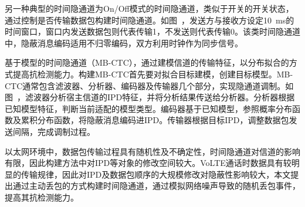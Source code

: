 另一种典型的时间隐通道为On/Off模式的时间隐通道，类似于开关的开关状态，通过控制是否传输数据包构建时间隐通道。如图\ ，发送方与接收方设定{10\ ms}的时间窗口，窗口内发送数据包则代表传输1，不发送则代表传输0。该类时间隐通道中，隐蔽消息编码适用不归零编码，双方利用时钟作为同步信号。

基于模型的时间隐通道（MB-CTC），通过建模信道的传输特征，以分布拟合的方式提高抗检测能力。构建MB-CTC首先要对拟合目标建模，创建目标模型。MB-CTC通常包含滤波器、分析器、编码器及传输器几个部分，实现隐通道调制。如图\ ，滤波器分析宿主信道的IPD特征，并将分析结果传送给分析器。分析器根据已知模型特征，判断当前适配的模型类型。编码器基于已知模型，参照概率分布函数及累积分布函数，将隐蔽消息编码进IPD。传输器根据目标IPD，调整数据包发送间隔，完成调制过程。

以太网环境中，数据包传输过程具有随机性及不确定性，时间隐通道对信道的影响有限，因此构建方法中对IPD等对象的修改空间较大。VoLTE通话时数据具有较明显的传输规律，因此对IPD及数据包顺序的大规模修改对隐蔽性影响较大，本文提出通过主动丢包的方式构建时间隐通道，通过模拟网络噪声导致的随机丢包事件，提高其抗检测能力。

